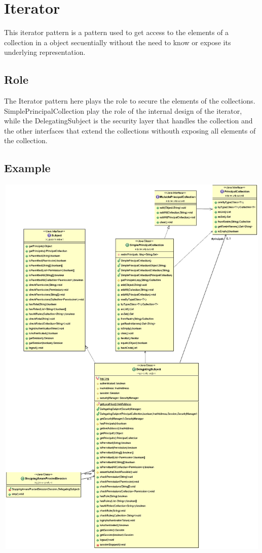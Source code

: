 \section{Iterator}

This iterator pattern is a pattern used to get access to the elements of a collection in a object secuentially without the need to know or expose its underlying representation.


\subsection*{Role}

The Iterator pattern here plays the role to secure the elements of the collections. SimplePrincipalCollection play the role of the internal design of the iterator, while the DelegatingSubject is the security layer that handles the collection and the other interfaces that extend the collections withouth exposing all elements of the collection.

\subsection*{Example}

\begin{center}
\includegraphics[width=16cm, height=19cm]{images/iterator.png}
\end{center}

